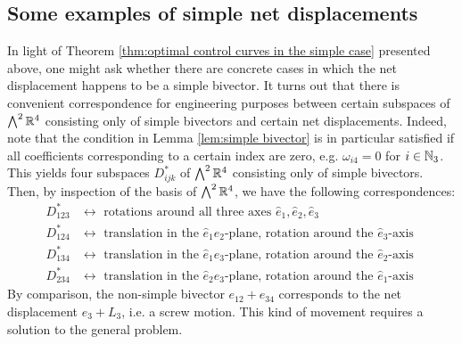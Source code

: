 \subsection{Some examples of simple net displacements}
In light of Theorem \ref{thm:optimal control curves in the simple case} presented above, one might ask whether there are concrete cases in which the net displacement happens to be a simple bivector. It turns out that there is convenient correspondence for engineering purposes between certain subspaces of $\bigwedge^2 \mathbb{R}^4$ consisting only of simple bivectors and certain net displacements. Indeed, note that the condition in Lemma \ref{lem:simple bivector} is in particular satisfied if all coefficients corresponding to a certain index are zero, e.g. $\omega_{i4} = 0$ for $i \in \mathbb{N}_3$. This yields four subspaces $D^*_{ijk}$ of $\bigwedge^2 \mathbb{R}^4$ consisting only of simple bivectors. Then, by inspection of the basis of $\bigwedge^2 \mathbb{R}^4$, we have the following correspondences:
\begin{align*}
D^{*}_{123} &\longleftrightarrow\text{ rotations around all three axes } \hat{e}_1, \hat{e}_2, \hat{e}_3\\
D^{*}_{124} &\longleftrightarrow \text{ translation in the $\hat{e}_1\hat{e}_2$-plane, rotation around the $\hat{e}_3$-axis }\\
D^{*}_{134} &\longleftrightarrow  \text{ translation in the $\hat{e}_1\hat{e}_3$-plane, rotation around the $\hat{e}_2$-axis }\\
D^{*}_{234} &\longleftrightarrow  \text{ translation in the $\hat{e}_2\hat{e}_3$-plane, rotation around the $\hat{e}_1$-axis }
\end{align*}
By comparison, the non-simple bivector $e_{12} + e_{34}$ corresponds to the net displacement $e_3 + L_3$, i.e. a screw motion. This kind of movement requires a solution to the general problem.






